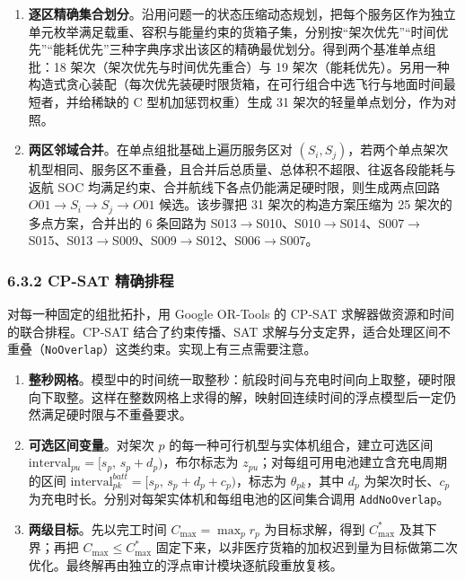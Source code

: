 \documentclass[withoutpreface,bwprint]{format}
\begin{document}
\begin{enumerate}[leftmargin=*]
    \item \textbf{逐区精确集合划分}。沿用问题一的状态压缩动态规划，把每个服务区作为独立单元枚举满足载重、容积与能量约束的货箱子集，分别按“架次优先”“时间优先”“能耗优先”三种字典序求出该区的精确最优划分。得到两个基准单点组批：18 架次（架次优先与时间优先重合）与 19 架次（能耗优先）。另用一种构造式贪心装配（每次优先装硬时限货箱，在可行组合中选飞行与地面时间最短者，并给稀缺的 C 型机加惩罚权重）生成 31 架次的轻量单点划分，作为对照。
    \item \textbf{两区邻域合并}。在单点组批基础上遍历服务区对 $(S_i, S_j)$，若两个单点架次机型相同、服务区不重叠，且合并后总质量、总体积不超限、往返各段能耗与返航 SOC 均满足约束、合并航线下各点仍能满足硬时限，则生成两点回路 $O01 \to S_i \to S_j \to O01$ 候选。该步骤把 31 架次的构造方案压缩为 25 架次的多点方案，合并出的 6 条回路为 S013$\to$S010、S010$\to$S014、S007$\to$S015、S013$\to$S009、S009$\to$S012、S006$\to$S007。
\end{enumerate}

\subsubsection{6.3.2 CP-SAT 精确排程}
对每一种固定的组批拓扑，用 Google OR-Tools 的 CP-SAT 求解器做资源和时间的联合排程。CP-SAT 结合了约束传播、SAT 求解与分支定界，适合处理区间不重叠（\texttt{NoOverlap}）这类约束\cite{laborie2018}。实现上有三点需要注意。

\begin{enumerate}[leftmargin=*]
    \item \textbf{整秒网格}。模型中的时间统一取整秒：航段时间与充电时间向上取整，硬时限向下取整。这样在整数网格上求得的解，映射回连续时间的浮点模型后一定仍然满足硬时限与不重叠要求。
    \item \textbf{可选区间变量}。对架次 $p$ 的每一种可行机型与实体机组合，建立可选区间 $\text{interval}_{pu} = [s_p,\, s_p + d_p)$，布尔标志为 $z_{pu}$；对每组可用电池建立含充电周期的区间 $\text{interval}_{pk}^{batt} = [s_p,\, s_p + d_p + c_p)$，标志为 $\theta_{pk}$，其中 $d_p$ 为架次时长、$c_p$ 为充电时长。分别对每架实体机和每组电池的区间集合调用 \texttt{AddNoOverlap}。
    \item \textbf{两级目标}。先以完工时间 $C_{\max} = \max_p r_p$ 为目标求解，得到 $C_{\max}^*$ 及其下界；再把 $C_{\max} \le C_{\max}^*$ 固定下来，以非医疗货箱的加权迟到量为目标做第二次优化。最终解再由独立的浮点审计模块逐航段重放复核。
\end{enumerate}
\end{document}
